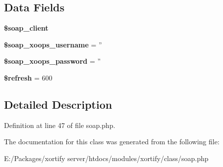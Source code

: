 \subsection*{Data Fields}
\begin{DoxyCompactItemize}
\item 
\hypertarget{class_s_o_a_p_xortify_exchange_a18c3d5ef7b606d5f21c8fda9d08e8c7e}{{\bfseries \$soap\-\_\-client}}\label{class_s_o_a_p_xortify_exchange_a18c3d5ef7b606d5f21c8fda9d08e8c7e}

\item 
\hypertarget{class_s_o_a_p_xortify_exchange_ab46ae973f580890282bce8dbe346abab}{{\bfseries \$soap\-\_\-xoops\-\_\-username} = ''}\label{class_s_o_a_p_xortify_exchange_ab46ae973f580890282bce8dbe346abab}

\item 
\hypertarget{class_s_o_a_p_xortify_exchange_ac116a126fa48c572acc0a859f42fa8dc}{{\bfseries \$soap\-\_\-xoops\-\_\-password} = ''}\label{class_s_o_a_p_xortify_exchange_ac116a126fa48c572acc0a859f42fa8dc}

\item 
\hypertarget{class_s_o_a_p_xortify_exchange_a8527f826b6959aaa92b0e51ee427ba1a}{{\bfseries \$refresh} = 600}\label{class_s_o_a_p_xortify_exchange_a8527f826b6959aaa92b0e51ee427ba1a}

\end{DoxyCompactItemize}


\subsection{Detailed Description}


Definition at line 47 of file soap.\-php.



The documentation for this class was generated from the following file\-:\begin{DoxyCompactItemize}
\item 
E\-:/\-Packages/xortify server/htdocs/modules/xortify/class/soap.\-php\end{DoxyCompactItemize}
